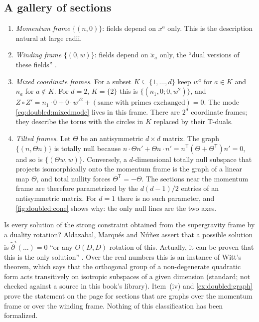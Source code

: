 \subsection{A gallery of sections}

\begin{enumerate}[leftmargin=*,label=(\roman*)]
\item \emph{Momentum frame} $\{(n,0)\}$: fields depend on $x^a$ only. This is the description
 natural at large radii.
\item \emph{Winding frame} $\{(0,w)\}$: fields depend on $\tilde x_a$ only, the ``dual versions
 of these fields'' .
\item \emph{Mixed coordinate frames}. For a subset $K\subseteq\{1,\dots,d\}$ keep $w^a$ for
 $a\in K$ and $n_a$ for $a\notin K$. For $d=2$, $K=\{2\}$ this is $\{(n_1,0;0,w^2)\}$, and
 $Z\circ Z'=n_1\cdot0+0\cdot w'^2+(\text{same with primes exchanged})=0$. The mode
 \eqref{eq:doubled:mixedmode} lives in this frame. There are $2^d$ coordinate frames; they
 describe the torus with the circles in $K$ replaced by their T-duals.
\item \emph{Tilted frames}. Let $\Theta$ be an antisymmetric $d\times d$ matrix. The graph
 $\{(n,\Theta n)\}$ is totally null because $n\cdot\Theta n'+\Theta n\cdot n'=
 n^{\mathsf T}(\Theta+\Theta^{\mathsf T})n'=0$, and so is $\{(\Theta w,w)\}$. Conversely, a
 $d$-dimensional totally null subspace that projects isomorphically onto the momentum frame is
 the graph of a linear map $\Theta$, and total nullity forces $\Theta^{\mathsf T}=-\Theta$. The
 sections near the momentum frame are therefore parametrized by the $d(d-1)/2$ entries of an
 antisymmetric matrix. For $d=1$ there is no such parameter, and \cref{fig:doubled:cone} shows
 why: the only null lines are the two axes.
\end{enumerate}

Is every solution of the strong constraint obtained from the supergravity frame by a duality
rotation? Aldazabal, Marqu\'es and N\'u\~nez assert that a possible solution is
$\tilde\partial^i(\dots)=0$ ``or any $O(D,D)$ rotation of this. Actually, it can be proven that
this is the only solution'' . \TL{} Over the real numbers this
is an instance of Witt's theorem, which says that the orthogonal group of a non-degenerate
quadratic form acts transitively on isotropic subspaces of a given dimension (standard; not
checked against a source in this book's library). Item~(iv) and \cref{ex:doubled:graph} prove the statement on the page for sections that are
graphs over the momentum frame or over the winding frame. Nothing of this
classification has been formalized.

